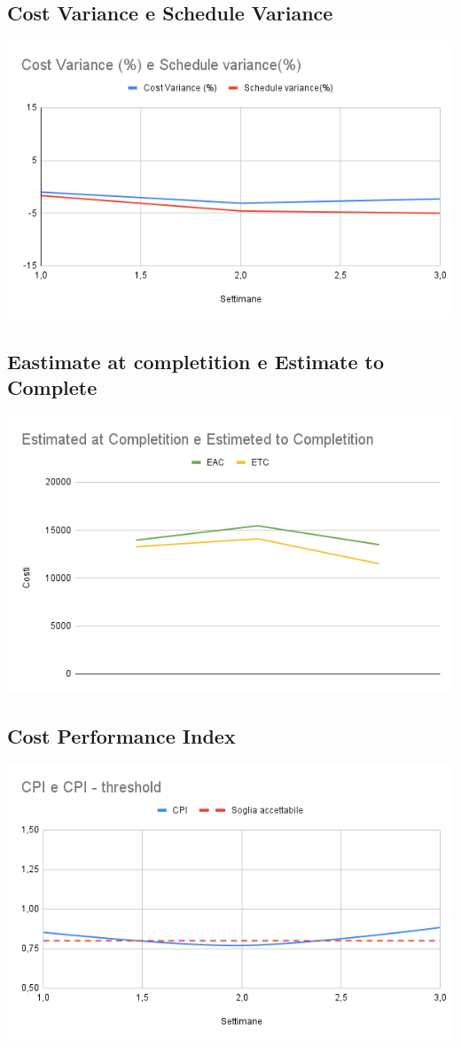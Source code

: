 \documentclass[12pt]{article}
\begin{document}
\subsection{Cost Variance e Schedule Variance}
\begin{center}
	\includegraphics[scale=0.5]{Cost_Variance_Schedule_Variance.png}
\end{center}

\subsection{Eastimate at completition e Estimate to Complete}
\begin{center}
	\includegraphics[scale=0.6]{EAC_ETC.png}
\end{center}
\subsection{Cost Performance Index}
\begin{center}
	\includegraphics[scale=0.6]{CPI.png}
\end{center}
\end{document}

